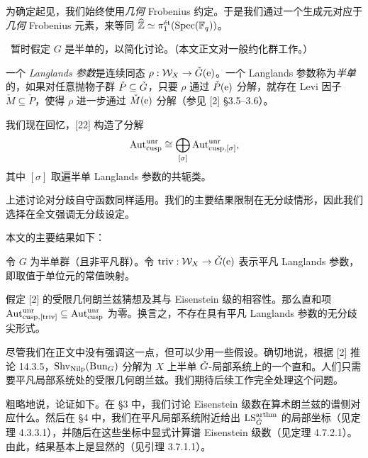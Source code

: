 \begin{notation}
为确定起见，我们始终使用\emph{几何} Frobenius 约定。于是我们通过一个生成元对应于\emph{几何} Frobenius 元素，来等同 $\widehat{\ZZ} \simeq \pi_1^{\et}(\Spec(\F_q))$。
\end{notation}

\ 暂时假定 $G$ 是半单的，以简化讨论。（本文正文对一般约化群工作。）

一个 \emph{Langlands 参数}是连续同态 $\rho: \mathcal{W}_X \to \bG(\e)$。一个 Langlands 参数称为\emph{半单}的，如果对任意抛物子群 $\check{P} \subseteq \bG$，只要 $\rho$ 通过 $\check{P}(\e)$ 分解，就存在 Levi 因子 $\check{M} \subseteq \check{P}$，使得 $\rho$ 进一步通过 $\check{M}(\e)$ 分解（参见 [2] §3.5--3.6）。

我们现在回忆，[22] 构造了分解
\begin{equation}
  \Aut^{\unr}_{\cusp} \cong \bigoplus_{[\sigma]} \Aut^{\unr}_{\cusp,[\sigma]},
\end{equation}
其中 $[\sigma]$ 取遍半单 Langlands 参数的共轭类。

\begin{remark}
上述讨论对分歧自守函数同样适用。我们的主要结果限制在无分歧情形，因此我们选择在全文强调无分歧设定。
\end{remark}

\pnum{}本文的主要结果如下：

\begin{thmA}
令 $G$ 为半单群（且非平凡群）。令 $\triv: \mathcal{W}_X \to \bG(\e)$ 表示平凡 Langlands 参数，即取值于单位元的常值映射。

假定 [2] 的受限几何朗兰兹猜想及其与 Eisenstein 级的相容性。那么直和项 $\Aut^{\unr}_{\cusp,[\triv]} \subseteq \Aut^{\unr}_{\cusp}$ 为零。换言之，不存在具有平凡 Langlands 参数的无分歧尖形式。
\end{thmA}

\begin{remark}
尽管我们在正文中没有强调这一点，但可以少用一些假设。确切地说，根据 [2] 推论 14.3.5，$\Shv_{\Nilp}(\Bun_G)$ 分解为 $X$ 上半单 $\bG$-局部系统上的一个直和。人们只需要平凡局部系统处的受限几何朗兰兹。我们期待后续工作完全处理这个问题。
\end{remark}

\begin{remark}
粗略地说，论证如下。在 §3 中，我们讨论 Eisenstein 级数在算术朗兰兹的谱侧对应什么。然后在 §4 中，我们在平凡局部系统附近给出 $\LS^{\arthm}_{\bG}$ 的局部坐标（见定理 4.3.3.1），并随后在这些坐标中显式计算谱 Eisenstein 级数（见定理 4.7.2.1）。由此，结果基本上是显然的（见引理 3.7.1.1）。
\end{remark}

